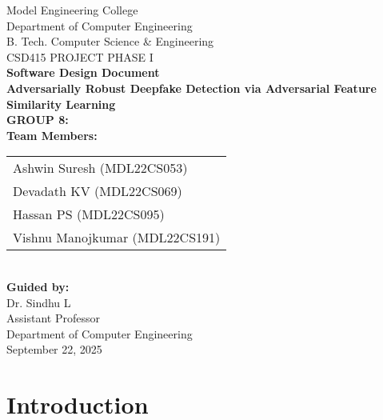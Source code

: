 \documentclass[a4paper,12pt]{article}
\begin{document}
  

\begin{titlepage}
    \centering
    \vspace*{2cm}  
    
    {\Large Model Engineering College}\\[0.5cm]
    {\Large Department of Computer Engineering}\\[1cm]
    
    {\Large B. Tech. Computer Science \& Engineering}\\[0.8cm]
    
    {\LARGE {CSD415 PROJECT PHASE I}}\\[1cm]
    
    {\Huge \textbf{Software Design Document}}\\[0.8cm]
    
    {\LARGE \textbf{Adversarially Robust Deepfake Detection via Adversarial Feature Similarity Learning}}\\[1.5cm]
    
    \textbf{GROUP 8:}\\
    \textbf{Team Members:} \\[0.5cm]
    \large
    \begin{tabular}{l}
        Ashwin Suresh (MDL22CS053)\\
        Devadath KV (MDL22CS069)\\
        Hassan PS (MDL22CS095)\\
        Vishnu Manojkumar (MDL22CS191)
    \end{tabular}\\[1.5cm]
    
    \textbf{Guided by:}\\
    Dr. Sindhu L\\
    Assistant Professor\\
    Department of Computer Engineering\\[1cm]

    \vfill  
    {\Large September 22, 2025}  
    
\end{titlepage}

\newpage

\tableofcontents
\newpage

\section{Introduction}
\end{document}
